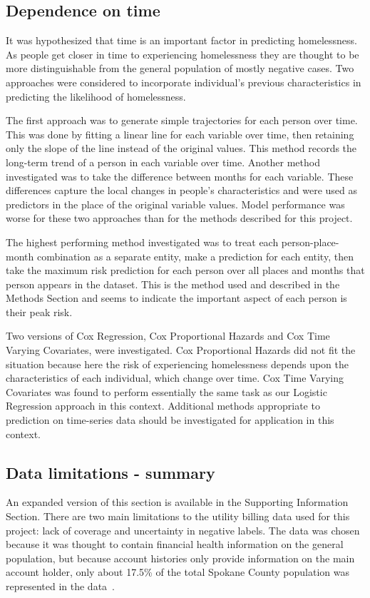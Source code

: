 \documentclass[10pt,letterpaper]{article}
\begin{document}
\subsection*{Dependence on time}
It was hypothesized that time is an important factor in predicting homelessness. As people get closer in time to experiencing homelessness they are thought to be more distinguishable from the general population of mostly negative cases. Two approaches were considered to incorporate individual's previous characteristics in predicting the likelihood of homelessness.

The first approach was to generate simple trajectories for each person over time. This was done by fitting a linear line for each variable over time, then retaining only the slope of the line instead of the original values. This method records the long-term trend of a person in each variable over time. Another method investigated was to take the difference between months for each variable. These differences capture the local changes in people's characteristics and were used as predictors in the place of the original variable values. Model performance was worse for these two approaches than for the methods described for this project.

The highest performing method investigated was to treat each person-place-month combination as a separate entity, make a prediction for each entity, then take the maximum risk prediction for each person over all places and months that person appears in the dataset. This is the method used and described in the Methods Section and seems to indicate the important aspect of each person is their peak risk. 

Two versions of Cox Regression, Cox Proportional Hazards and Cox Time Varying Covariates, were investigated. Cox Proportional Hazards did not fit the situation because here the risk of experiencing homelessness depends upon the characteristics of each individual, which change over time. Cox Time Varying Covariates was found to perform essentially the same task as our Logistic Regression approach in this context. Additional methods appropriate to prediction on time-series data should be investigated for application in this context. 

\subsection*{Data limitations - summary}
An expanded version of this section is available in the Supporting Information Section. There are two main limitations to the utility billing data used for this project: lack of coverage and uncertainty in negative labels. The data was chosen because it was thought to contain financial health information on the general population, but because account histories only provide information on the main account holder, only about 17.5\% of the total Spokane County population was represented in the data~\cite{SpokanePop}.
\end{document}
